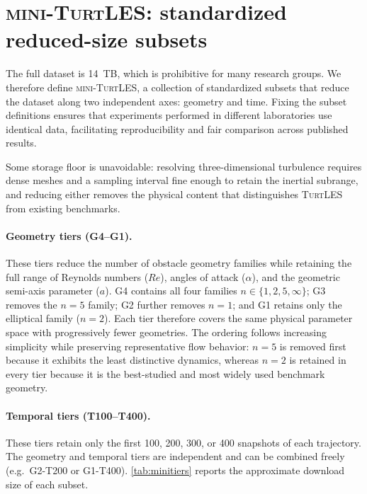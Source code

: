 \documentclass{article}
\begin{document}
{\color{revcolor}
\section{\textsc{mini-TurtLES}: standardized reduced-size subsets} \label{sec:appmini}

The full dataset is 14~TB, which is prohibitive for many research groups. We therefore define \textsc{mini-TurtLES}, a collection of standardized subsets that reduce the dataset along two independent axes: geometry and time. Fixing the subset definitions ensures that experiments performed in different laboratories use identical data, facilitating reproducibility and fair comparison across published results.

Some storage floor is unavoidable: resolving three-dimensional turbulence requires dense meshes and a sampling interval fine enough to retain the inertial subrange, and reducing either removes the physical content that distinguishes \textsc{TurtLES} from existing benchmarks.

\paragraph{Geometry tiers (G4--G1).}
These tiers reduce the number of obstacle geometry families while retaining the full range of Reynolds numbers ($Re$), angles of attack ($\alpha$), and the geometric semi-axis parameter ($a$). G4 contains all four families $n \in \{1, 2, 5, \infty\}$; G3 removes the $n = 5$ family; G2 further removes $n = 1$; and G1 retains only the elliptical family ($n = 2$). Each tier therefore covers the same physical parameter space with progressively fewer geometries. The ordering follows increasing simplicity while preserving representative flow behavior: $n = 5$ is removed first because it exhibits the least distinctive dynamics, whereas $n = 2$ is retained in every tier because it is the best-studied and most widely used benchmark geometry.

\paragraph{Temporal tiers (T100--T400).}
These tiers retain only the first 100, 200, 300, or 400 snapshots of each trajectory. The geometry and temporal tiers are independent and can be combined freely (e.g.\ G2-T200 or G1-T400). \autoref{tab:minitiers} reports the approximate download size of each subset.

}
\end{document}
